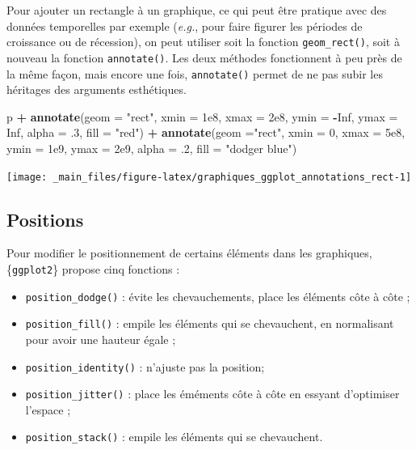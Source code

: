 \documentclass[
  11pt,
]{book}
\newenvironment{Shaded}{\begin{snugshade}}{\end{snugshade}}
\newcommand{\DataTypeTok}[1]{\textcolor[rgb]{0.13,0.29,0.53}{#1}}
\newcommand{\DecValTok}[1]{\textcolor[rgb]{0.00,0.00,0.81}{#1}}
\newcommand{\FloatTok}[1]{\textcolor[rgb]{0.00,0.00,0.81}{#1}}
\newcommand{\KeywordTok}[1]{\textcolor[rgb]{0.13,0.29,0.53}{\textbf{#1}}}
\newcommand{\NormalTok}[1]{#1}
\newcommand{\OperatorTok}[1]{\textcolor[rgb]{0.81,0.36,0.00}{\textbf{#1}}}
\newcommand{\OtherTok}[1]{\textcolor[rgb]{0.56,0.35,0.01}{#1}}
\newcommand{\StringTok}[1]{\textcolor[rgb]{0.31,0.60,0.02}{#1}}
\providecommand{\tightlist}{%
  \setlength{\itemsep}{0pt}\setlength{\parskip}{0pt}}
\numberwithin{equation}{section}
\numberwithin{countremarque}{section}
\begin{document}
Pour ajouter un rectangle à un graphique, ce qui peut être pratique avec des données temporelles par exemple (\emph{e.g.}, pour faire figurer les périodes de croissance ou de récession), on peut utiliser soit la fonction \texttt{geom\_rect()}, soit à nouveau la fonction \texttt{annotate()}. Les deux méthodes fonctionnent à peu près de la même façon, mais encore une fois, \texttt{annotate()} permet de ne pas subir les héritages des arguments esthétiques.

\begin{Shaded}
\begin{Highlighting}[]
\NormalTok{p }\OperatorTok{+}\StringTok{ }\KeywordTok{annotate}\NormalTok{(}\DataTypeTok{geom =} \StringTok{"rect"}\NormalTok{, }\DataTypeTok{xmin =} \FloatTok{1e8}\NormalTok{, }\DataTypeTok{xmax =} \FloatTok{2e8}\NormalTok{,}
             \DataTypeTok{ymin =} \OperatorTok{{-}}\OtherTok{Inf}\NormalTok{, }\DataTypeTok{ymax =} \OtherTok{Inf}\NormalTok{,}
             \DataTypeTok{alpha =} \FloatTok{.3}\NormalTok{, }\DataTypeTok{fill =} \StringTok{"red"}\NormalTok{) }\OperatorTok{+}
\StringTok{  }\KeywordTok{annotate}\NormalTok{(}\DataTypeTok{geom  =}\StringTok{"rect"}\NormalTok{, }\DataTypeTok{xmin =} \DecValTok{0}\NormalTok{, }\DataTypeTok{xmax =} \FloatTok{5e8}\NormalTok{,}
           \DataTypeTok{ymin =} \FloatTok{1e9}\NormalTok{, }\DataTypeTok{ymax =} \FloatTok{2e9}\NormalTok{,}
           \DataTypeTok{alpha =} \FloatTok{.2}\NormalTok{, }\DataTypeTok{fill =} \StringTok{"dodger blue"}\NormalTok{)}
\end{Highlighting}
\end{Shaded}

\begin{center}\texttt{[image: \_main\_files/figure-latex/graphiques\_ggplot\_annotations\_rect-1]} \end{center}

\hypertarget{graphiques_ggplot_position}{%
\subsection{Positions}\label{graphiques_ggplot_position}}

Pour modifier le positionnement de certains éléments dans les graphiques, \{\texttt{ggplot2}\} propose cinq fonctions :

\begin{itemize}
\tightlist
\item
  \texttt{position\_dodge()} : évite les chevauchements, place les éléments côte à côte ;
\item
  \texttt{position\_fill()} : empile les éléments qui se chevauchent, en normalisant pour avoir une hauteur égale ;
\item
  \texttt{position\_identity()} : n'ajuste pas la position;
\item
  \texttt{position\_jitter()} : place les éméments côte à côte en essyant d'optimiser l'espace ;
\item
  \texttt{position\_stack()} : empile les éléments qui se chevauchent.
\end{itemize}
\end{document}
